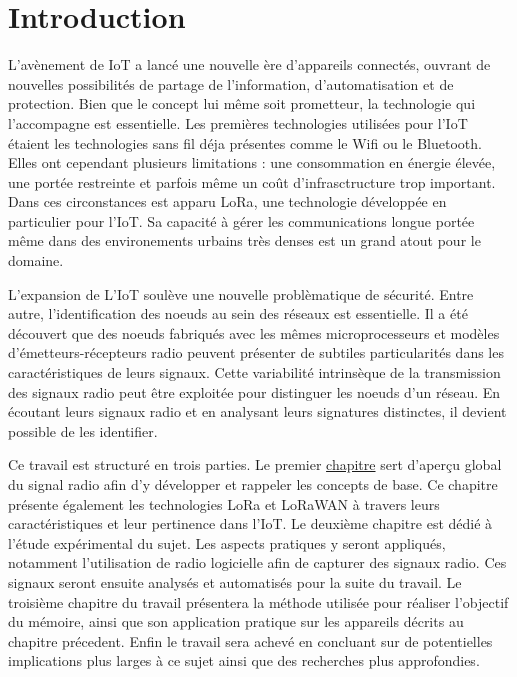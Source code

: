 

\chapter*{Introduction}

\renewcommand{\leftmark}{INTRODUCTION}

L'avènement de \ac{IoT} a lancé une nouvelle ère d'appareils connectés, ouvrant de nouvelles possibilités de partage de l'information, d'automatisation et de protection. Bien que le concept lui même soit prometteur, la technologie qui l'accompagne est essentielle.
Les premières technologies utilisées pour l'\ac{IoT} étaient les technologies sans fil déja présentes comme le Wifi ou le Bluetooth. Elles ont cependant plusieurs limitations : une consommation en énergie élevée, une portée restreinte et parfois même un coût d'infrasctructure trop important.
Dans ces circonstances est apparu \ac{LoRa}, une technologie développée en particulier pour l'IoT. Sa capacité à gérer les communications longue portée même dans des environements urbains très denses est un grand atout pour le domaine.

\vspace{0.1cm}

L'expansion de L'\ac{IoT} soulève une nouvelle problèmatique de sécurité. Entre autre, l'identification des noeuds au sein des réseaux est essentielle. Il a été dé\-couvert que des noeuds fabriqués avec les mêmes microprocesseurs et modèles d'émetteurs-récepteurs radio peuvent présenter de subtiles particularités dans les caractéristiques de leurs signaux. Cette variabilité intrinsèque de la transmission des signaux radio peut être exploitée pour distinguer les noeuds d’un réseau. En écoutant leurs signaux radio et en analysant leurs signatures distinctes, il devient possible de les identifier.

\vspace{0.1cm}

Ce travail est structuré en trois parties. Le premier          \hyperref[chap1]{chapitre} sert d'aperçu global du signal radio afin d'y développer et rappeler les concepts de base. Ce chapitre présente également les technologies \ac{LoRa} et LoRaWAN à travers leurs caractéristiques et leur pertinence dans l'\ac{IoT}.
Le deuxième chapitre est dédié à l'étude expérimental du sujet. Les aspects pratiques y seront appliqués, notamment l'utilisation de radio logicielle afin de capturer des signaux radio. Ces signaux seront ensuite analysés et automatisés pour la suite du travail.
Le troisième chapitre du travail présentera la méthode utilisée pour réaliser l'objectif du mémoire, ainsi que son application pratique sur les appareils décrits au chapitre précedent. Enfin le travail sera achevé en concluant sur de potentielles implications plus larges à ce sujet ainsi que des recherches plus approfondies.


